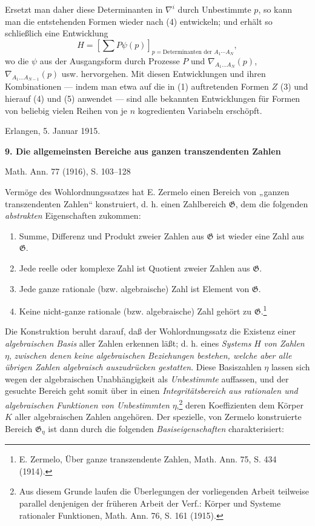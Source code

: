 \documentclass[11pt]{article}
\begin{document}
Ersetzt man daher diese Determinanten in $\nabla^i$ durch Unbestimmte $p$, so kann man die entstehenden Formen wieder nach (4) entwickeln; und erhält so schließlich eine Entwicklung
\begin{equation}
  H=\left[\sum P\psi(p)\right]_{p=\text{Determinanten der }A_1\cdots A_N},
\tag{5}
\end{equation}
wo die $\psi$ aus der Ausgangsform durch Prozesse $P$ und $\nabla_{A_1\ldots A_N}(p)$, $\nabla_{A_1\ldots A_{N-1}}(p)$ usw. hervorgehen. Mit diesen Entwicklungen und ihren Kombinationen --- indem man etwa auf die in (1) auftretenden Formen $Z$ (3) und hierauf (4) und (5) anwendet --- sind alle bekannten Entwicklungen für Formen von beliebig vielen Reihen von je $n$ kogredienten Variabeln erschöpft.

Erlangen, 5. Januar 1915.



\clearpage

\begin{center}
{\Large\bfseries 9. Die allgemeinsten Bereiche aus ganzen transzendenten Zahlen}\par
\vspace{1.2em}
Math. Ann. 77 (1916), S. 103--128
\end{center}

Vermöge des Wohlordnungssatzes hat E. Zermelo einen Bereich von
„ganzen transzendenten Zahlen“ konstruiert, d. h. einen Zahlbereich
$\mathfrak G$, dem die folgenden \emph{abstrakten} Eigenschaften zukommen:
\begin{enumerate}
\item[I.] Summe, Differenz und Produkt zweier Zahlen aus $\mathfrak G$ ist wieder
eine Zahl aus $\mathfrak G$.
\item[II.] Jede reelle oder komplexe Zahl ist Quotient zweier Zahlen aus $\mathfrak G$.
\item[III.] Jede ganze rationale (bzw. algebraische) Zahl ist Element von $\mathfrak G$.
\item[IV.] Keine nicht-ganze rationale (bzw. algebraische) Zahl gehört zu
$\mathfrak G$.\footnote{E. Zermelo, Über ganze transzendente Zahlen,
Math. Ann. 75, S. 434 (1914).}
\end{enumerate}

Die Konstruktion beruht darauf, daß der Wohlordnungssatz die Existenz
einer \emph{algebraischen Basis} aller Zahlen erkennen läßt; d. h. eines
\emph{Systems} $H$ \emph{von Zahlen} $\eta$, \emph{zwischen denen keine
algebraischen Beziehungen bestehen, welche aber alle übrigen Zahlen algebraisch
auszudrücken gestatten}. Diese Basiszahlen $\eta$ lassen sich wegen der
algebraischen Unabhängigkeit als \emph{Unbestimmte} auffassen, und der gesuchte
Bereich geht somit über in einen \emph{Integritätsbereich aus rationalen und
algebraischen Funktionen von Unbestimmten} $\eta$,\footnote{Aus diesem Grunde
laufen die Überlegungen der vorliegenden Arbeit teilweise parallel denjenigen
der früheren Arbeit der Verf.: Körper und Systeme rationaler Funktionen,
Math. Ann. 76, S. 161 (1915).} deren Koeffizienten dem Körper $K$ aller
algebraischen Zahlen angehören. Der spezielle, von Zermelo konstruierte
Bereich $\mathfrak G_\eta$ ist dann durch die folgenden \emph{Basiseigenschaften}
charakterisiert:
\end{document}
